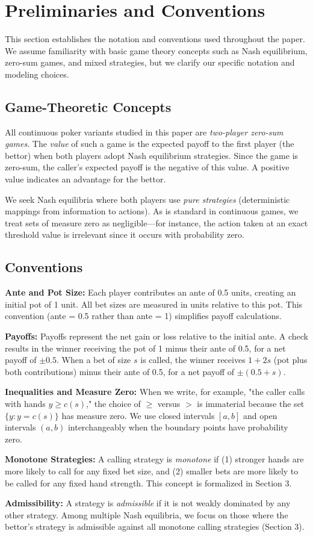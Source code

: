 \documentclass[../../main/main.tex]{subfiles}
\begin{document}
\section{Preliminaries and Conventions}

This section establishes the notation and conventions used throughout the paper. We assume familiarity with basic game theory concepts such as Nash equilibrium, zero-sum games, and mixed strategies, but we clarify our specific notation and modeling choices.

\subsection{Game-Theoretic Concepts}

All continuous poker variants studied in this paper are \textit{two-player zero-sum games}. The \textit{value} of such a game is the expected payoff to the first player (the bettor) when both players adopt Nash equilibrium strategies. Since the game is zero-sum, the caller's expected payoff is the negative of this value. A positive value indicates an advantage for the bettor.

We seek Nash equilibria where both players use \textit{pure strategies} (deterministic mappings from information to actions). As is standard in continuous games, we treat sets of measure zero as negligible---for instance, the action taken at an exact threshold value is irrelevant since it occurs with probability zero.

\subsection{Conventions}

\textbf{Ante and Pot Size:} Each player contributes an ante of 0.5 units, creating an initial pot of 1 unit. All bet sizes are measured in units relative to this pot. This convention (ante = 0.5 rather than ante = 1) simplifies payoff calculations.

\textbf{Payoffs:} Payoffs represent the net gain or loss relative to the initial ante. A check results in the winner receiving the pot of 1 minus their ante of 0.5, for a net payoff of $\pm 0.5$. When a bet of size $s$ is called, the winner receives $1 + 2s$ (pot plus both contributions) minus their ante of 0.5, for a net payoff of $\pm(0.5 + s)$.

\textbf{Inequalities and Measure Zero:} When we write, for example, "the caller calls with hands $y \geq c(s)$," the choice of $\geq$ versus $>$ is immaterial because the set $\{y : y = c(s)\}$ has measure zero. We use closed intervals $[a,b]$ and open intervals $(a,b)$ interchangeably when the boundary points have probability zero.

\textbf{Monotone Strategies:} A calling strategy is \textit{monotone} if (1) stronger hands are more likely to call for any fixed bet size, and (2) smaller bets are more likely to be called for any fixed hand strength. This concept is formalized in Section 3.

\textbf{Admissibility:} A strategy is \textit{admissible} if it is not weakly dominated by any other strategy. Among multiple Nash equilibria, we focus on those where the bettor's strategy is admissible against all monotone calling strategies (Section 3).
\end{document}
